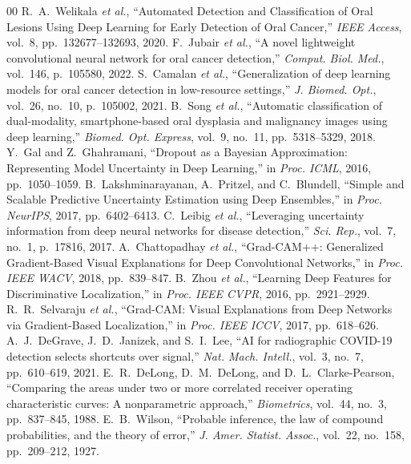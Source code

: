 \documentclass[journal]{IEEEtran}
\begin{document}
\begin{thebibliography}{00}
 R.~A.~Welikala \textit{et al.}, ``Automated Detection and Classification of Oral Lesions Using Deep Learning for Early Detection of Oral Cancer,'' \textit{IEEE Access}, vol.~8, pp.~132677--132693, 2020.
 F.~Jubair \textit{et al.}, ``A novel lightweight convolutional neural network for oral cancer detection,'' \textit{Comput. Biol. Med.}, vol.~146, p.~105580, 2022.
 S.~Camalan \textit{et al.}, ``Generalization of deep learning models for oral cancer detection in low-resource settings,'' \textit{J. Biomed. Opt.}, vol.~26, no.~10, p.~105002, 2021.
 B.~Song \textit{et al.}, ``Automatic classification of dual-modality, smartphone-based oral dysplasia and malignancy images using deep learning,'' \textit{Biomed. Opt. Express}, vol.~9, no.~11, pp.~5318--5329, 2018.
 Y.~Gal and Z.~Ghahramani, ``Dropout as a Bayesian Approximation: Representing Model Uncertainty in Deep Learning,'' in \textit{Proc. ICML}, 2016, pp.~1050--1059.
 B.~Lakshminarayanan, A.~Pritzel, and C.~Blundell, ``Simple and Scalable Predictive Uncertainty Estimation using Deep Ensembles,'' in \textit{Proc. NeurIPS}, 2017, pp.~6402--6413.
 C.~Leibig \textit{et al.}, ``Leveraging uncertainty information from deep neural networks for disease detection,'' \textit{Sci. Rep.}, vol.~7, no.~1, p.~17816, 2017.
 A.~Chattopadhay \textit{et al.}, ``Grad-CAM++: Generalized Gradient-Based Visual Explanations for Deep Convolutional Networks,'' in \textit{Proc. IEEE WACV}, 2018, pp.~839--847.
 B.~Zhou \textit{et al.}, ``Learning Deep Features for Discriminative Localization,'' in \textit{Proc. IEEE CVPR}, 2016, pp.~2921--2929.
 R.~R.~Selvaraju \textit{et al.}, ``Grad-CAM: Visual Explanations from Deep Networks via Gradient-Based Localization,'' in \textit{Proc. IEEE ICCV}, 2017, pp.~618--626.
 A.~J.~DeGrave, J.~D.~Janizek, and S.~I.~Lee, ``AI for radiographic COVID-19 detection selects shortcuts over signal,'' \textit{Nat. Mach. Intell.}, vol.~3, no.~7, pp.~610--619, 2021.
 E.~R.~DeLong, D.~M.~DeLong, and D.~L.~Clarke-Pearson, ``Comparing the areas under two or more correlated receiver operating characteristic curves: A nonparametric approach,'' \textit{Biometrics}, vol.~44, no.~3, pp.~837--845, 1988.
 E.~B.~Wilson, ``Probable inference, the law of compound probabilities, and the theory of error,'' \textit{J. Amer. Statist. Assoc.}, vol.~22, no.~158, pp.~209--212, 1927.

\end{thebibliography}
\end{document}
